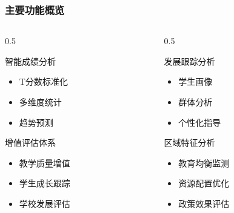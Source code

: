 \documentclass[aspectratio=169]{beamer}
\begin{document}
\begin{frame}
    \frametitle{主要功能概览}
    \begin{columns}
        \begin{column}{0.5\textwidth}
            \begin{block}{智能成绩分析}
                \begin{itemize}
                    \item T分数标准化
                    \item 多维度统计
                    \item 趋势预测
                \end{itemize}
            \end{block}
            
            \begin{block}{增值评估体系}
                \begin{itemize}
                    \item 教学质量增值
                    \item 学生成长跟踪
                    \item 学校发展评估
                \end{itemize}
            \end{block}
        \end{column}
        
        \begin{column}{0.5\textwidth}
            \begin{block}{发展跟踪分析}
                \begin{itemize}
                    \item 学生画像
                    \item 群体分析
                    \item 个性化指导
                \end{itemize}
            \end{block}
            
            \begin{block}{区域特征分析}
                \begin{itemize}
                    \item 教育均衡监测
                    \item 资源配置优化
                    \item 政策效果评估
                \end{itemize}
            \end{block}
        \end{column}
    \end{columns}
\end{frame}
\end{document}
